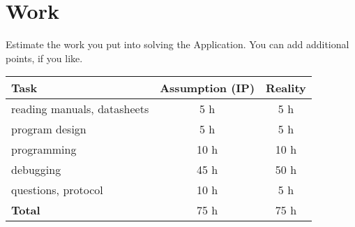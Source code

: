\documentclass[12pt,a4paper,titlepage,oneside]{article}
\begin{document}
\section{Work}

Estimate the work you put into solving the Application.
You can add additional points, if you like.

\begin{tabular}{|l|c|c|}\hline
	Task & Assumption (IP) & Reality \\ \hline

	reading manuals, datasheets &  5 h &  5 h\\
	program design              &  5 h &  5 h\\
	programming                 & 10 h & 10 h\\
	debugging                   & 45 h & 50 h\\
	questions, protocol         & 10 h &  5 h\\ \hline

	\textbf{Total}              & 75 h & 75 h\\ \hline
\end{tabular}


\newpage
\end{document}
